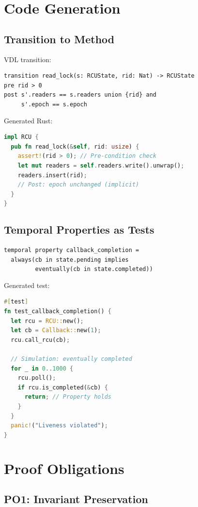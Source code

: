 \documentclass[conference]{IEEEtran}
\begin{document}
\section{Code Generation}

\subsection{Transition to Method}

VDL transition:
\begin{lstlisting}
transition read_lock(s: RCUState, rid: Nat) -> RCUState
pre rid > 0
post s'.readers == s.readers union {rid} and
     s'.epoch == s.epoch
\end{lstlisting}

Generated Rust:
\begin{lstlisting}[language=Rust]
impl RCU {
  pub fn read_lock(&self, rid: usize) {
    assert!(rid > 0); // Pre-condition check
    let mut readers = self.readers.write().unwrap();
    readers.insert(rid);
    // Post: epoch unchanged (implicit)
  }
}
\end{lstlisting}

\subsection{Temporal Properties as Tests}

\begin{lstlisting}
temporal property callback_completion =
  always(cb in state.pending implies
         eventually(cb in state.completed))
\end{lstlisting}

Generated test:
\begin{lstlisting}[language=Rust]
#[test]
fn test_callback_completion() {
  let rcu = RCU::new();
  let cb = Callback::new(1);
  rcu.call_rcu(cb);
  
  // Simulation: eventually completed
  for _ in 0..1000 {
    rcu.poll();
    if rcu.is_completed(&cb) {
      return; // Property holds
    }
  }
  panic!("Liveness violated");
}
\end{lstlisting}

\section{Proof Obligations}

\subsection{PO1: Invariant Preservation}
\end{document}
